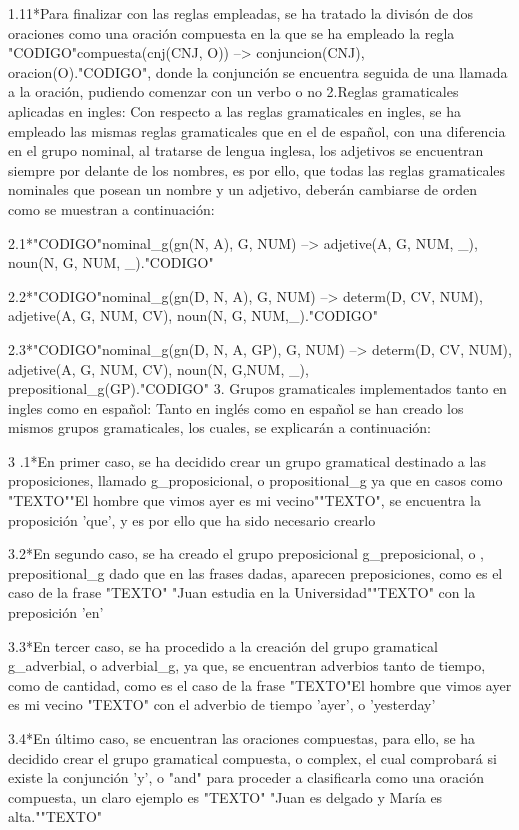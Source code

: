 ﻿\documentclass[a4paper]{article}
\begin{document}
 1.11*Para finalizar con las reglas empleadas, se ha tratado la divisón de dos oraciones como una          oración compuesta en la que se ha empleado la regla "CODIGO"compuesta(cnj(CNJ, O)) -->                conjuncion(CNJ), oracion(O)."CODIGO", donde la conjunción se encuentra seguida de una llamada a       la oración, pudiendo comenzar con un verbo o no
 2.Reglas gramaticales aplicadas en ingles:
   Con respecto a las reglas gramaticales en ingles, se ha empleado las mismas reglas gramaticales    que en el de español, con una diferencia en el grupo nominal, al tratarse de lengua inglesa, los    adjetivos se encuentran siempre por delante de los nombres, es por ello, que todas las reglas    gramaticales nominales que posean un nombre y un adjetivo, deberán cambiarse de orden como se      muestran a continuación:
     
 2.1*"CODIGO"nominal_g(gn(N, A), G, NUM) --> adjetive(A, G, NUM, _), noun(N, G, NUM, _)."CODIGO"
     
 2.2*"CODIGO"nominal_g(gn(D, N, A), G, NUM) --> determ(D, CV, NUM), adjetive(A, G, NUM, CV), noun(N,      G, NUM,_)."CODIGO"
     
 2.3*"CODIGO"nominal_g(gn(D, N, A, GP), G, NUM) --> determ(D, CV, NUM), adjetive(A, G, NUM, CV),          noun(N, G,NUM, _), prepositional_g(GP)."CODIGO"
3. Grupos gramaticales implementados tanto en ingles como en español:
Tanto en inglés como en español se han creado los mismos grupos gramaticales, los cuales, se explicarán a continuación:
     
3 .1*En primer caso, se ha decidido crear un grupo gramatical destinado a las proposiciones, llamado      g_proposicional, o propositional_g ya que en casos como "TEXTO""El hombre que vimos ayer es mi      vecino""TEXTO", se encuentra la proposición 'que', y es por ello que ha sido necesario crearlo
     
 3.2*En segundo caso, se ha creado el grupo preposicional g_preposicional, o , prepositional_g dado       que en las frases dadas, aparecen preposiciones, como es el caso de la frase "TEXTO" "Juan           estudia en la Universidad""TEXTO" con la preposición 'en'
     
 3.3*En tercer caso, se ha procedido a la creación del grupo gramatical g_adverbial, o adverbial_g,      ya que, se encuentran adverbios tanto de tiempo, como de cantidad, como es el caso de la frase      "TEXTO"El hombre que vimos ayer es mi vecino "TEXTO" con el adverbio de tiempo 'ayer', o      'yesterday'
     
 3.4*En último caso, se encuentran las oraciones compuestas, para ello, se ha decidido crear el      grupo gramatical compuesta, o complex, el cual comprobará si existe la conjunción 'y', o "and"        para proceder a clasificarla como una oración compuesta, un claro ejemplo es "TEXTO" "Juan es         delgado y María es alta.""TEXTO"
\end{document}
